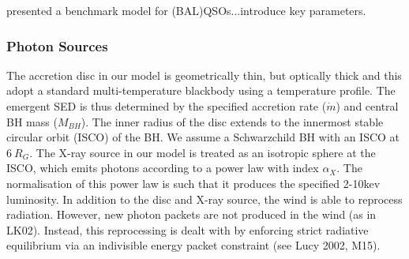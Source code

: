 \documentclass[preprint, a4paper, 11pt]{aastex}
\begin{document}
\cite{higginbottom2013} presented a benchmark model for
(BAL)QSOs...introduce key parameters. 

\subsubsection{Photon Sources}


The accretion disc in our model is geometrically thin, but optically thick
and this adopt a standard multi-temperature blackbody
using a \cite{shakurasunyaev1973} temperature profile. 
The emergent SED is thus determined by the specified accretion rate ($\dot{m}$)
and central BH mass ($M_{BH}$).
The inner radius of the disc extends to the innermost 
stable circular orbit (ISCO) of the BH. 
We assume a Schwarzchild BH with an ISCO at $6~R_G$.
The X-ray source in our model is treated as an isotropic sphere at the ISCO,
which emits photons according to a power law with index $\alpha_X$.
The normalisation of this power law is such that it produces the specified 
2-10kev luminosity.
In addition to the disc and X-ray source, 
the wind is able to reprocess radiation. However, new 
photon packets are not produced in the wind (as in LK02). 
Instead, this reprocessing is dealt with by enforcing strict
radiative equilibrium via an indivisible energy packet
constraint (see Lucy 2002, M15).








\end{document}
